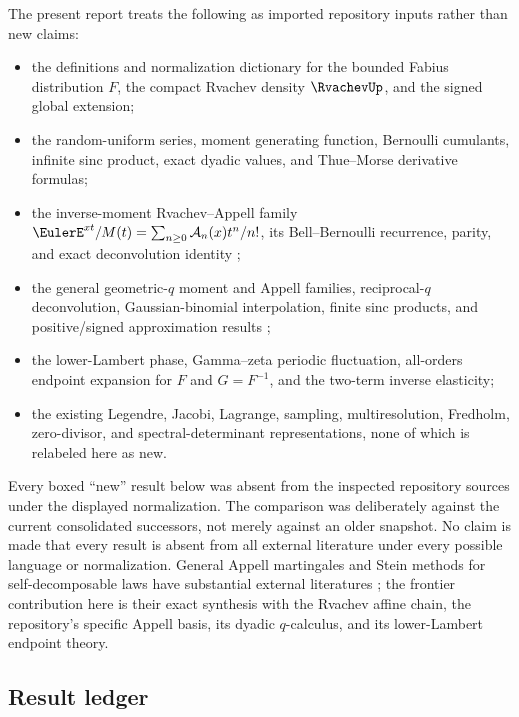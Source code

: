 \documentclass[11pt,a4paper]{article}
\theoremstyle{definition}
\theoremstyle{remark}
\newcommand{\Acal}{\mathcal A}
\begin{document}
The present report treats the following as imported repository inputs rather than new claims:
\begin{itemize}
\item the definitions and normalization dictionary for the bounded Fabius distribution $F$, the compact Rvachev density $\RvachevUp$, and the signed global extension;
\item the random-uniform series, moment generating function, Bernoulli cumulants, infinite sinc product, exact dyadic values, and Thue--Morse derivative formulas;
\item the inverse-moment Rvachev--Appell family
\(
 \EulerE^{xt}/M(t)=\sum_{n\ge0}\Acal_n(x)t^n/n!
\), its Bell--Bernoulli recurrence, parity, and exact deconvolution identity \cite{ProveItInverse};
\item the general geometric-$q$ moment and Appell families, reciprocal-$q$ deconvolution, Gaussian-binomial interpolation, finite sinc products, and positive/signed approximation results \cite{ProveItQ};
\item the lower-Lambert phase, Gamma--zeta periodic fluctuation, all-orders endpoint expansion for $F$ and $G=F^{-1}$, and the two-term inverse elasticity;
\item the existing Legendre, Jacobi, Lagrange, sampling, multiresolution, Fredholm, zero-divisor, and spectral-determinant representations, none of which is relabeled here as new.
\end{itemize}

\begin{cautionbox}
Every boxed ``new'' result below was absent from the inspected repository sources under the displayed normalization. The comparison was deliberately against the current consolidated successors, not merely against an older snapshot. No claim is made that every result is absent from all external literature under every possible language or normalization. General Appell martingales and Stein methods for self-decomposable laws have substantial external literatures \cite{DiNardo2013,ArrasHoudre2019,ArrasHoudre2022}; the frontier contribution here is their exact synthesis with the Rvachev affine chain, the repository's specific Appell basis, its dyadic $q$-calculus, and its lower-Lambert endpoint theory.
\end{cautionbox}

\subsection{Result ledger}
\end{document}
